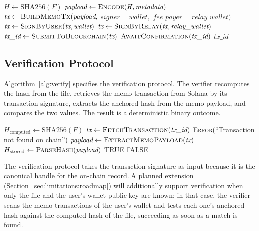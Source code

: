 \documentclass[11pt,a4paper]{article}
\begin{document}
\begin{algorithm}[ht]
\caption{\textsc{RegisterFile}($F$, \textit{wallet}, \textit{metadata})}
\label{alg:register}
\begin{algorithmic}[1]
\State $H \gets \mathrm{SHA256}(F)$
\State $\textit{payload} \gets \textsc{Encode}(H, \textit{metadata})$
\State $\textit{tx} \gets \textsc{BuildMemoTx}(\textit{payload},$
    \State \quad\quad $\textit{signer} = \textit{wallet},$
    \State \quad\quad $\textit{fee\_payer} = \textit{relay\_wallet})$
\State $\textit{tx} \gets \textsc{SignByUser}(\textit{tx}, \textit{wallet})$
\State $\textit{tx} \gets \textsc{SignByRelay}(\textit{tx}, \textit{relay\_wallet})$
\State $\textit{tx\_id} \gets \textsc{SubmitToBlockchain}(\textit{tx})$
\State $\textsc{AwaitConfirmation}(\textit{tx\_id})$
\State \Return $\textit{tx\_id}$
\end{algorithmic}
\end{algorithm}

\subsection{Verification Protocol}
\label{sec:architecture:verify}

Algorithm~\ref{alg:verify} specifies the verification protocol. The
verifier recomputes the hash from the file, retrieves the memo
transaction from Solana by its transaction signature, extracts the
anchored hash from the memo payload, and compares the two values. The
result is a deterministic binary outcome.

\begin{algorithm}[ht]
\caption{\textsc{VerifyFile}($F$, \textit{tx\_id})}
\label{alg:verify}
\begin{algorithmic}[1]
\State $H_{\text{computed}} \gets \mathrm{SHA256}(F)$
\State $\textit{tx} \gets \textsc{FetchTransaction}(\textit{tx\_id})$
    \State \Return \textsc{Error}(``Transaction not found on chain'')
\EndIf
\State $\textit{payload} \gets \textsc{ExtractMemoPayload}(\textit{tx})$
\State $H_{\text{stored}} \gets \textsc{ParseHash}(\textit{payload})$
    \State \Return TRUE 
\Else
    \State \Return FALSE 
\EndIf
\end{algorithmic}
\end{algorithm}

The verification protocol takes the transaction signature as input
because it is the canonical handle for the on-chain record. A planned
extension (Section~\ref{sec:limitations:roadmap}) will additionally
support verification when only the file and the user's wallet public
key are known: in that case, the verifier scans the memo transactions
of the user's wallet and tests each one's anchored hash against the
computed hash of the file, succeeding as soon as a match is found.
\end{document}
